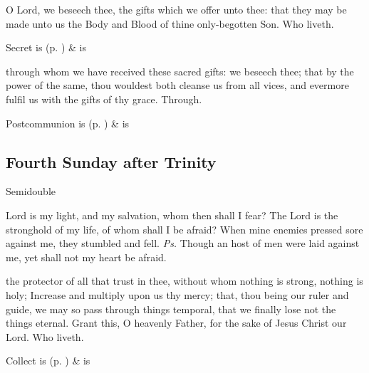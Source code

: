 
\secret\label{TrinityIIISecret}
 O Lord, we beseech thee, the gifts which we offer unto thee: that they may be made unto us the Body and Blood of thine only-begotten Son. Who liveth.

\begin{rubric}
     Secret is  (p. \pageref{SPSaints}) \&  is 
\end{rubric}


\postcommunion\label{TrinityIIIPostcommunion}
 through whom we have received these sacred gifts: we beseech thee; that by the power of the same, thou wouldest both cleanse us from all vices, and evermore fulfil us with the gifts of thy grace. Through.

\begin{rubric}
     Postcommunion is  (p. \pageref{SPSaints}) \&  is 
\end{rubric}


\clearpage
\subsection{Fourth Sunday after Trinity}
\begin{inhead}
    {Semidouble}
\end{inhead}


\introit
{} Lord is my light, and my salvation, whom then shall I fear? The Lord is the stronghold of my life, of whom shall I be afraid? When mine enemies pressed sore against me, they stumbled and fell. \textit{Ps.} Though an host of men were laid against me, yet shall not my heart be afraid.

\collect
{} the protector of all that trust in thee, without whom nothing is strong, nothing is holy; Increase and multiply upon us thy mercy; that, thou being our ruler and guide, we may so pass through things temporal, that we finally lose not the things eternal. Grant this, O heavenly Father, for the sake of Jesus Christ our Lord. Who liveth.
\begin{rubric}
     Collect is  (p. \pageref{SPSaints}) \&  is 
\end{rubric}

